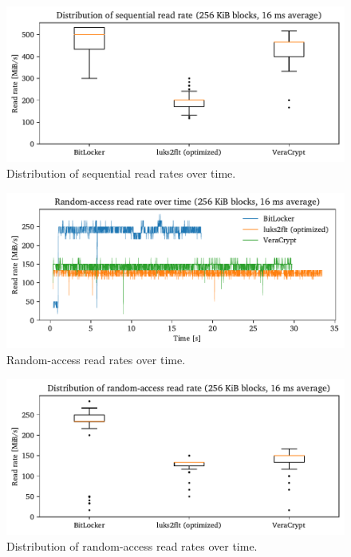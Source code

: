 \begin{figure}[htb!]
	\center
	\includegraphics[scale=1]{../fig/performance.hwexperiments.seqovertimebox.pdf}
	\caption[
		Distribution of sequential read rates over time
	]{
		Distribution of sequential read rates over time.  
	}
	\label{fig:performance.hwexperiments.seqovertimebox}
\end{figure}

\begin{figure}[htb!]
	\center
	\includegraphics[scale=1]{../fig/performance.hwexperiments.randovertime.pdf}
	\caption[
		Random-access read rates over time
	]{
		Random-access read rates over time.  
	}
	\label{fig:performance.hwexperiments.randovertime}
\end{figure}

\begin{figure}[htb!]
	\center
	\includegraphics[scale=1]{../fig/performance.hwexperiments.randovertimebox.pdf}
	\caption[
		Distribution of random-access read rates over time
	]{
		Distribution of random-access read rates over time. 
	}
	\label{fig:performance.hwexperiments.randovertimebox}
\end{figure}


